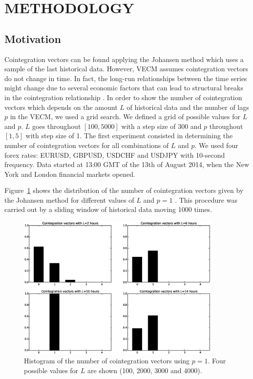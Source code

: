 \section{\uppercase{Methodology}} \label{sec:methodology}
\subsection{Motivation} \label{sec:proposal}

Cointegration vectors can be found applying the Johansen method which uses a
sample of the last historical data. However, VECM assumes cointegration vectors do not change in time.
In fact, the long-run relationships between the time series might change due to
several economic factors that can lead to structural breaks in the cointegration
relationship \cite{gregoryETal1996}. 
In order to show the number of cointegration vectors which depends on 
the amount $L$ of historical data and the number of lags $p$ in the VECM, we used a grid search. We defined a grid of possible values for $L$ and $p$. $L$ goes throughout $[100,5000]$ with a step size of 300 and $p$  throughout $[1,5]$ with step size of 1. The first experiment consisted in determining the number of cointegration vectors for all combinations of $L$ and $p$.
We used four forex rates: EURUSD, GBPUSD, USDCHF and USDJPY with 10-second frequency. Data started at 13:00 GMT of the 13th of August 2014,
when the New York and London financial markets opened.

Figure~\ref{fig:hists} shows the distribution of the number of cointegration vectors 
given by the Johansen method for different values of $L$ and $p=1$ . This procedure was carried out by a sliding window of historical data moving 1000 times.



\begin{figure}[!h]
  \centering
  \includegraphics[width=0.9\textwidth]{img/histCointVectors-offset15000-p-1-freq-10s}
  \caption{Histogram of the number of cointegration vectors using $p=1$. Four
  possible values for $L$ are shown (100, 2000, 3000 and 4000).}
  \label{fig:hists}
\end{figure}


